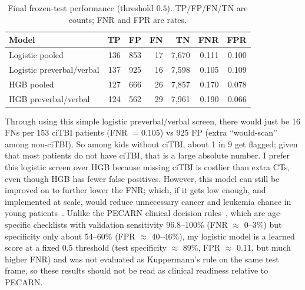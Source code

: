 \documentclass[10pt,letterpaper]{article}
\begin{document}
\begin{table}[H]
    \centering
    \caption{Final frozen-test performance (threshold $0.5$). TP/FP/FN/TN are counts; FNR and FPR are rates.}
    \label{tab:final-test}
    \begin{tabular}{lrrrrrr}
    \hline
    Model & TP & FP & FN & TN & FNR & FPR \\
    \hline
    Logistic pooled & 136 & 853 & 17 & 7{,}670 & 0.111 & 0.100 \\
    Logistic preverbal/verbal & 137 & 925 & 16 & 7{,}598 & 0.105 & 0.109 \\
    HGB pooled & 127 & 666 & 26 & 7{,}857 & 0.170 & 0.078 \\
    HGB preverbal/verbal & 124 & 562 & 29 & 7{,}961 & 0.190 & 0.066 \\
    \hline
    \end{tabular}
\end{table}

Through using this simple logistic preverbal/verbal screen, there would just be 16 FNs per 153 ciTBI patients (FNR $=0.105$) vs 925 FP (extra ``would-scan'' among non-ciTBI).
So among kids without ciTBI, about 1 in 9 get flagged; given that most patients do not have ciTBI, that is a large absolute number.
I prefer this logistic screen over HGB because missing ciTBI is costlier than extra CTs, even though HGB has fewer false positives.
However, this model can still be improved on to further lower the FNR; which, if it gets low enough, and implemented at scale, would reduce unnecessary cancer and leukemia chance in young patients~\cite{pearce2012,miglioretti2013}.
Unlike the PECARN clinical decision rules~\cite{kuppermann2009}, which are age-specific checklists with validation sensitivity 96.8--100\% (FNR $\approx$ 0--3\%) but specificity only about 54--60\% (FPR $\approx$ 40--46\%), my logistic model is a learned score at a fixed $0.5$ threshold (test specificity $\approx$ 89\%, FPR $\approx$ 0.11, but much higher FNR) and was not evaluated as Kuppermann's rule on the same test frame, so these results should not be read as clinical readiness relative to PECARN.

\end{document}
